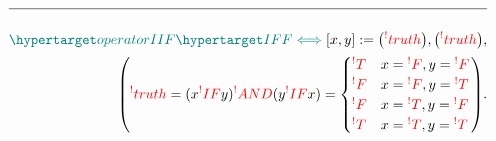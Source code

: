 \documentclass[a4paper]{article}
\makeatletter
\def\ml{\mleft}
\def\mr{\mright}
\newcommand{\defeq}{:=}
\newcommand{\cusand}{,}
\newcommand{\cuspop}{.}
\newcommand{\eqComment}[1]{\text{  \# #1}}
\newcommand{\n}{\\[1.5ex] \hline \nonumber \\[0ex]}
\newcommand{\m}{\nonumber \\}
\newcommand\rfrlist[1]{%
    \forcsvlist{\rfrlist@item}{#1}
}
\newcommand\rfrlist@item[1]{\rfr{#1}\\}
\newcommand{\thmlink}[2]{{}_{\substack{\rfrlist{#1}}}^{\dfn{#2}} }
\makeatother
\begin{document}
\begin{tcolorbox}
\begin{align}
\n \dfn{operatorIIF} [\dfn{IFF}[\iff]][x, y] \defeq \ml(\rfr{truth} [x][]\mr) \cusand \ml(\rfr{truth} [y][]\mr) \cusand 
\m \ml(\rfr{truth} [x \rfr{IFF} y][] = (x \rfr{IF} y) \rfr{AND} (y \rfr{IF} x) = \begin{cases} \rfr{T} & x = \rfr{F} \cusand y = \rfr{F} \\ \rfr{F} & x = \rfr{F} \cusand y = \rfr{T} \\ \rfr{F} & x = \rfr{T} \cusand y = \rfr{F} \\ \rfr{T} & x = \rfr{T} \cusand y = \rfr{T} \end{cases}\mr) \cuspop
\end{align}
\end{tcolorbox}

\begin{comment}

\subsection{Boolean Algebra Properties}
\begin{tcolorbox}[breakable, enhanced]
\begin{align}
   \thmlink{POS-LCom}{THM-Dual-1} \Bigg(\rfrOLD{booleanAlgebra}[\{\rfrOLD{T}, \rfrOLD{F}\}, \rfrOLD{\land}, \rfrOLD{\lor}, \rfrOLD{\lnot}][] \rfrOLD{\iff}
\m \ml(\ml(x \rfrOLD{\lor} y = y \rfrOLD{\lor} x\mr) \cusand \ml(x \rfrOLD{\land} y = y \rfrOLD{\land} x\mr)\mr) \eqComment{Reordered Commutative} \cusand
\m \ml(\ml(x \rfrOLD{\lor} \ml(y \rfrOLD{\land} z\mr) = \ml(x \rfrOLD{\lor} y\mr) \rfrOLD{\land} \ml(x \rfrOLD{\lor} z\mr)\mr) \cusand \ml(x \rfrOLD{\land} \ml(y \rfrOLD{\lor} z\mr) = \ml(x \rfrOLD{\land} y\mr) \rfrOLD{\lor} \ml(x \rfrOLD{\land} z\mr)\mr)\mr) \eqComment{Reordered Distributive} \cusand
\m \ml(\ml(x \rfrOLD{\lor} \rfrOLD{F} = x\mr) \cusand \ml(x \rfrOLD{\land} \rfrOLD{T} = x\mr)\mr) \eqComment{Reordered Identity} \cusand
\m \ml(\ml(x \rfrOLD{\lor} \rfrOLD{\lnot} x = \rfrOLD{T}\mr) \cusand \ml(x \rfrOLD{\land} \rfrOLD{\lnot} x = \rfrOLD{F}\mr)\mr) \eqComment{Reordered Complement} \cuspop \rfrOLD{\iff}
\m \rfrOLD{booleanAlgebra}[\{\rfrOLD{F}, \rfrOLD{T}\}, \rfrOLD{\lor}, \rfrOLD{\land}, \rfrOLD{\lnot}][]\Bigg)
\m \thmlink{THM-Dual-1}{THM-Dual} \ml(\rfrOLD{booleanAlgebra}[\{\rfrOLD{T}, \rfrOLD{F}\}, \rfrOLD{\land}, \rfrOLD{\lor}, \rfrOLD{\lnot}][] \rfrOLD{\iff} \rfrOLD{booleanAlgebra}[\{\rfrOLD{F}, \rfrOLD{T}\}, \rfrOLD{\lor}, \rfrOLD{\land}, \rfrOLD{\lnot}][]\mr)
\m \eqComment{Boolean Algebra Duality follows from the swap symmetry of $\ml(\rfrOLD{\land}, \rfrOLD{T}\mr)$ and $\ml(\rfrOLD{\lor}, \rfrOLD{F}\mr)$ within the axioms}

\end{comment}
\end{document}
